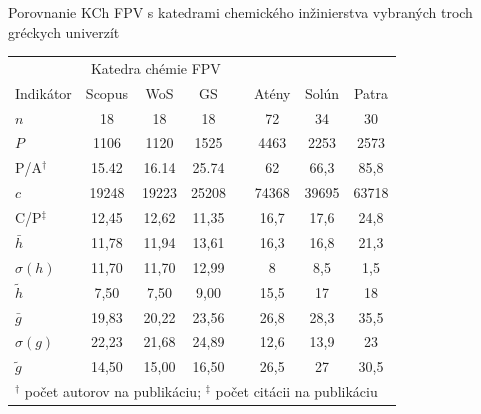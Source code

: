 \documentclass{beamer}
\begin{document}
%
%
\begin{frame}{Porovnanie KCh FPV s katedrami chemického inžinierstva vybraných troch gréckych univerzít}
  \begin{table}
    \footnotesize
    \begin{tabular}{lccclccc}
      \toprule
      & \multicolumn{3}{c}{Katedra chémie FPV} & & \multicolumn{3}{c}{\citet{Kazakis2015}} \\
      \cmidrule{2-4}\cmidrule{6-8}
      Indikátor & Scopus & WoS & GS & & Atény & Solún & Patra \\
      \midrule
      $n$            & 18    & 18    & 18    & & 72    & 34    & 30    \\
      $P$            & 1106  & 1120  & 1525  & & 4463  & 2253  & 2573  \\
      P/A$^\dagger$  & 15.42 & 16.14 & 25.74 & & 62    & 66,3  & 85,8  \\
      $c$            & 19248 & 19223 & 25208 & & 74368 & 39695 & 63718 \\
      C/P$^\ddagger$ & 12,45 & 12,62 & 11,35 & & 16,7  & 17,6  & 24,8  \\
      $\bar{h}$      & 11,78 & 11,94 & 13,61 & & 16,3  & 16,8  & 21,3  \\
      $\sigma (h)$   & 11,70 & 11,70 & 12,99 & & 8     & 8,5   & 1,5   \\
      $\tilde{h}$    & 7,50  & 7,50  & 9,00  & & 15,5  & 17    & 18    \\
      $\bar{g}$      & 19,83 & 20,22 & 23,56 & & 26,8  & 28,3  & 35,5  \\
      $\sigma (g)$   & 22,23 & 21,68 & 24,89 & & 12,6  & 13,9  & 23    \\
      $\tilde{g}$    & 14,50 & 15,00 & 16,50 & & 26,5  & 27    & 30,5  \\
      \bottomrule
      \multicolumn{8}{l}{\tiny $^\dagger$ počet autorov na publikáciu; $^\ddagger$ počet citácii na publikáciu}
    \end{tabular}
  \end{table}
\end{frame}
\end{document}
